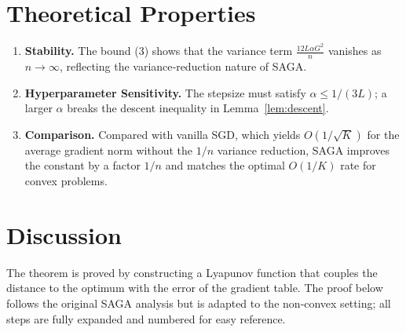 \documentclass{article}
\begin{document}
\section*{Theoretical Properties}
\begin{enumerate}[label=\arabic*.]
\item \textbf{Stability.} The bound (3) shows that the variance term 
$\frac{12L\alpha G^{2}}{n}$ vanishes as $n\to\infty$, reflecting the variance‑reduction nature of SAGA.
\item \textbf{Hyperparameter Sensitivity.} The stepsize must satisfy $\alpha\le 1/(3L)$; a larger $\alpha$ breaks the descent inequality in Lemma~\ref{lem:descent}.
\item \textbf{Comparison.} Compared with vanilla SGD, which yields $O(1/\sqrt{K})$ for the average gradient norm without the $1/n$ variance reduction, SAGA improves the constant by a factor $1/n$ and matches the optimal $O(1/K)$ rate for convex problems.
\end{enumerate}

\section*{Discussion}
The theorem is proved by constructing a Lyapunov function that couples the distance to the optimum with the error of the gradient table. The proof below follows the original SAGA analysis but is adapted to the non‑convex setting; all steps are fully expanded and numbered for easy reference.
\end{document}
